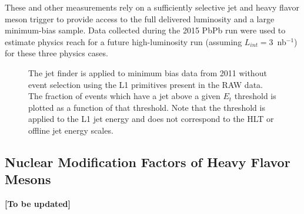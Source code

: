 These and other measurements rely on a sufficiently selective jet and heavy flavor meson trigger to provide access to the 
full delivered luminosity and a large minimum-bias sample.  Data collected during the 2015 PbPb run were used to estimate physics reach  
for a future high-luminosity run (assuming $L_{int} =$3~nb$^{-1}$) for these three physics cases. 

\begin{figure}[!ht]
\begin{center}
\caption{The jet finder is applied to minimum bias data from 2011 without
event selection using the L1 primitives present in the RAW data. The
fraction of events which have a jet above a given $E_t$ threshold is plotted
as a function of that threshold. Note that the threshold is applied to the
L1 jet energy and does not correspond to the HLT or offline jet energy
scales.}
\label{fig:efficiency_comparison}
\end{center}
\end{figure}


\subsection{Nuclear Modification Factors of Heavy Flavor Mesons}
{\bf [To be updated]}

